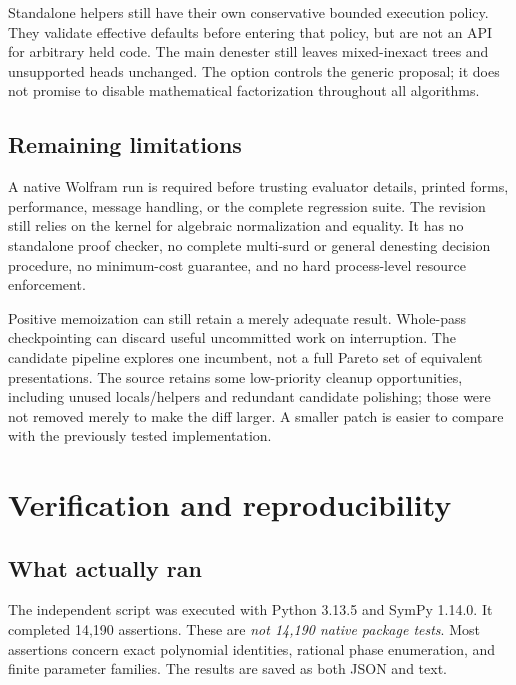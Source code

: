 \documentclass[11pt,a4paper]{article}
\newcommand{\code}[1]{\texttt{\detokenize{#1}}}
\theoremstyle{remark}\newtheorem{remark}[theorem]{Remark}
\begin{document}
Standalone helpers still have their own conservative bounded execution policy. They validate effective defaults before entering that policy, but are not an API for arbitrary held code. The main denester still leaves mixed-inexact trees and unsupported heads unchanged. The \code{Factor} option controls the generic \code{Factor} proposal; it does not promise to disable mathematical factorization throughout all algorithms.

\subsection{Remaining limitations}
A native Wolfram run is required before trusting evaluator details, printed forms, performance, message handling, or the complete regression suite. The revision still relies on the kernel for algebraic normalization and equality. It has no standalone proof checker, no complete multi-surd or general denesting decision procedure, no minimum-cost guarantee, and no hard process-level resource enforcement.

Positive memoization can still retain a merely adequate result. Whole-pass checkpointing can discard useful uncommitted work on interruption. The candidate pipeline explores one incumbent, not a full Pareto set of equivalent presentations. The source retains some low-priority cleanup opportunities, including unused locals/helpers and redundant candidate polishing; those were not removed merely to make the diff larger. A smaller patch is easier to compare with the previously tested implementation.

\section{Verification and reproducibility}
\subsection{What actually ran}
The independent script was executed with Python 3.13.5 and SymPy 1.14.0. It completed 14,190 assertions. These are \emph{not 14,190 native package tests}. Most assertions concern exact polynomial identities, rational phase enumeration, and finite parameter families. The results are saved as both JSON and text.
\end{document}
